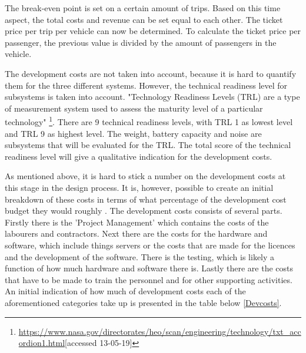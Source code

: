 The break-even point is set on a certain amount of trips. Based on this time aspect, the total costs and revenue can be set equal to each other. The ticket price per trip per vehicle can now be determined. To calculate the ticket price per passenger, the previous value is divided by the amount of passengers in the vehicle.

The development costs are not taken into account, because it is hard to quantify them for the three different systems. However, the technical readiness level for subsystems is taken into account. "Technology Readiness Levels (TRL) are a type of measurement system used to assess the maturity level of a particular technology" \footnote{\url{https://www.nasa.gov/directorates/heo/scan/engineering/technology/txt_accordion1.html}[accessed 13-05-19]}. There are 9 technical readiness levels, with TRL 1 as lowest level and TRL 9 as highest level. The weight, battery capacity and noise are subsystems that will be evaluated for the TRL. The total score of the technical readiness level will give a qualitative indication for the development costs. 

As mentioned above, it is hard to stick a number on the development costs at this stage in the design process. It is, however, possible to create an initial breakdown of these costs in terms of what percentage of the development cost budget they would roughly . The development costs consists of several parts. Firstly there is the 'Project Management' which contains the costs of the labourers and contractors. Next there are the costs for the hardware and software, which include things servers or the costs that are made for the licences and the development of the software. There is the testing, which is likely a function of how much hardware and software there is. Lastly there are the costs that have to be made to train the personnel and for other supporting activities. An initial indication of how much of development costs each of the aforementioned categories take up is presented in the table below \ref{Devcosts}. 



